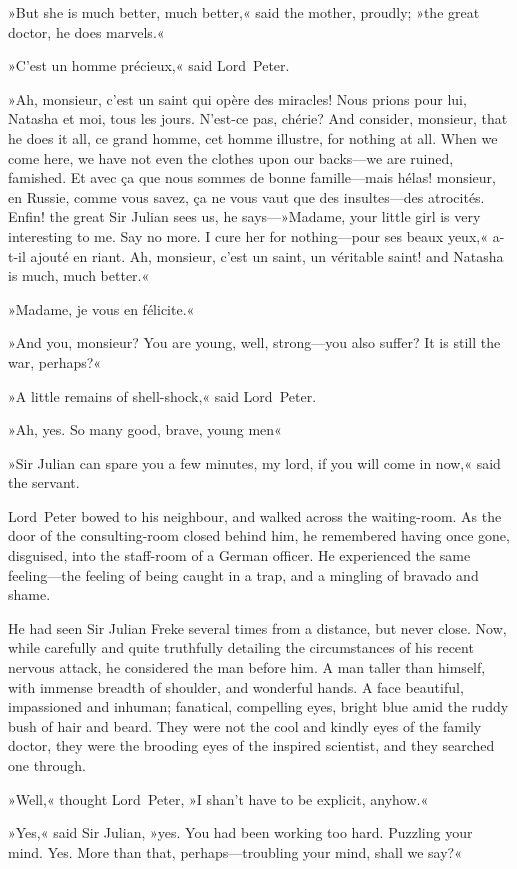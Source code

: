 »But she is much better, much better,« said the mother, proudly; »the great doctor, he does marvels.«

»C'est un homme précieux,« said Lord~Peter.

»Ah, monsieur, c'est un saint qui opère des miracles! Nous prions pour lui, Natasha et moi, tous les jours. N'est-ce pas, chérie? And consider, monsieur, that he does it all, ce grand homme, cet homme illustre, for nothing at all. When we come here, we have not even the clothes upon our backs—we are ruined, famished. Et avec ça que nous sommes de bonne famille—mais hélas! monsieur, en Russie, comme vous savez, ça ne vous vaut que des insultes—des atrocités. Enfin! the great Sir Julian sees us, he says---»Madame, your little girl is very interesting to me. Say no more. I cure her for nothing—pour ses beaux yeux,« a-t-il ajouté en riant. Ah, monsieur, c'est un saint, un véritable saint! and Natasha is much, much better.«

»Madame, je vous en félicite.«

»And you, monsieur? You are young, well, strong—you also suffer? It is still the war, perhaps?«

»A little remains of shell-shock,« said Lord~Peter.

»Ah, yes. So many good, brave, young men\longdash«

»Sir Julian can spare you a few minutes, my lord, if you will come in now,« said the servant.

Lord~Peter bowed to his neighbour, and walked across the waiting-room. As the door of the consulting-room closed behind him, he remembered having once gone, disguised, into the staff-room of a German officer. He experienced the same feeling—the feeling of being caught in a trap, and a mingling of bravado and shame.

He had seen Sir Julian Freke several times from a distance, but never close. Now, while carefully and quite truthfully detailing the circumstances of his recent nervous attack, he considered the man before him. A man taller than himself, with immense breadth of shoulder, and wonderful hands. A face beautiful, impassioned and inhuman; fanatical, compelling eyes, bright blue amid the ruddy bush of hair and beard. They were not the cool and kindly eyes of the family doctor, they were the brooding eyes of the inspired scientist, and they searched one through.

»Well,« thought Lord~Peter, »I shan't have to be explicit, anyhow.«

»Yes,« said Sir Julian, »yes. You had been working too hard. Puzzling your mind. Yes. More than that, perhaps—troubling your mind, shall we say?«

